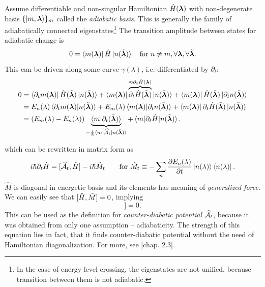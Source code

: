 Assume differentiable and non-singular Hamiltonian $\HH(\llambda)$ with non-degenerate basis $\{\ket{m,\llambda}\}_m$ called the \emph{adiabatic basis}. This is generally the family of adiabatically connected eigenstates\footnote{In the case of energy level crossing, the eigenstates are not unified, because transition between them is not adiabatic.} The transition amplitude between states for adiabatic change is
\begin{equation}
    0=\bra{m(\llambda)}\HH\ket{n(\tilde\llambda)} \quad \text{for }n\neq m, \forall \llambda,\forall \tilde \llambda.
\end{equation}
This can be driven along some curve $\gamma(\lambda)$, i.e. differentiated by $\partial_t$:
\begin{equation}
    \begin{split}
        0&=\bra{\partial_t m(\llambda)}\HH(\tilde \llambda)\ket{n(\tilde\llambda)}+ \bra{m(\llambda)}\overbrace{\partial_t\HH(\tilde \llambda)}^{\approx \partial_t\HH(\llambda)}\ket{n(\tilde\llambda)}+ \bra{m(\llambda)}\HH(\tilde \llambda)\ket{\partial_t n(\tilde \llambda)}\\
        &=E_n(\lambda)\braket{\partial_t m(\llambda)|n(\tilde \llambda)} + E_m(\lambda)\braket{m(\llambda)|\partial_t n(\tilde \llambda)}+ \bra{m(\llambda)}\partial_t \HH(\tilde\llambda)\ket{n(\tilde \llambda)}\\
        &= (E_m(\lambda)-E_n(\lambda))\underbrace{\braket{m|\partial_t (\tilde \llambda)}}_{-\frac{i}{\hbar}\bra{m}\AA_t\ket{n(\tilde \llambda)}} + \braket{m|\partial_t\HH|n(\tilde \llambda)},
    \end{split}
\end{equation}

which can be rewritten in matrix form as
\begin{equation}
    i\hbar\partial_t\HH=[\AA_t,\HH]-i\hbar \hat{M}_t\qquad \text{for } \hat{M}_t\equiv -\sum_n\pder{E_n(\lambda)}{t}\ket{n(\lambda)}\bra{n(\lambda)}.
\end{equation}
$\hat{M}$ is diagonal in energetic basis and its elements has meaning of \emph{generalized force}. We can easily see that $[\HH,\hat{M}]=0$, implying
\begin{equation}
    [\HH,i\hbar\partial_t\HH-[\AA_t,\HH]]=0.
    \label{eq:komutation}
\end{equation}
This can be used as the definition for \emph{counter-diabatic potential} $\AA_t$, because it was obtained from only one assumption -- adiabaticity. The strength of this equation lies in fact, that it finds counter-diabatic potential without the need of Hamiltonian diagonalization. For more, see \cite{kolodrubez}[chap. 2.3].











